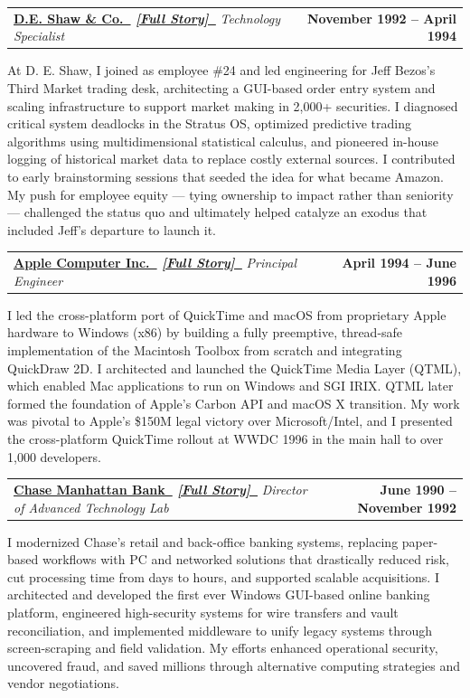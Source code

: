 \documentclass[letterpaper,11pt]{article}
\makeatletter
\newcommand{\faExternalLink}{\faIcon{external-link-alt}}
\renewcommand{\faExternalLink}{\faIcon{external-link-alt}}
\newcommand{\resumeItem}[1]{
    \item\small{
            {#1 \vspace{-2pt}}
    }
}
\newcommand{\resumeSubheading}[4]{
    \vspace{-2pt}\item
    \begin{tabular*}{1.0\textwidth}[t]{l@{\extracolsep{\fill}}r}
    \textbf{#1}  \textit{\small#3} & \textbf{\small #2} \\
    \end{tabular*}\vspace{-7pt}
}
\newcommand{\linkglyph}{{\LinkFont\symbol{"1F517}}}
\makeatother
\begin{document}
\resumeSubheading
{\href{https://www.deshaw.com}{D.E. Shaw \& Co.~\faExternalLink}
\quad\small
\textit
{\href {https://paul-charlton.vercel.app/story/25}{[Full Story]~{\linkglyph}}}
}
{November 1992 -- April 1994}
{Technology Specialist}
{New York, NY}
\resumeItem{
At D. E. Shaw, I joined as employee \#24 and led engineering for Jeff Bezos’s Third Market trading desk, architecting a GUI-based order entry system and scaling infrastructure to support market making in 2,000+ securities. I diagnosed critical system deadlocks in the Stratus OS, optimized predictive trading algorithms using multidimensional statistical calculus, and pioneered in-house logging of historical market data to replace costly external sources. I contributed to early brainstorming sessions that seeded the idea for what became Amazon. My push for employee equity — tying ownership to impact rather than seniority — challenged the status quo and ultimately helped catalyze an exodus that included Jeff’s departure to launch it.
}

\resumeSubheading
{\href{https://www.apple.com}{Apple Computer Inc.~\faExternalLink}
\quad\small
\textit
{\href{https://paul-charlton.vercel.app/story/11}{[Full Story]~{\linkglyph}}}
}
{April 1994 -- June 1996}
{Principal Engineer}
{Cupertino, CA}
\resumeItem{
I led the cross-platform port of QuickTime and macOS from proprietary Apple hardware to Windows (x86) by building a fully preemptive, thread-safe implementation of the Macintosh Toolbox from scratch and integrating QuickDraw 2D. I architected and launched the QuickTime Media Layer (QTML), which enabled Mac applications to run on Windows and SGI IRIX. QTML later formed the foundation of Apple’s Carbon API and macOS X transition. My work was pivotal to Apple’s \$150M legal victory over Microsoft/Intel, and I presented the cross-platform QuickTime rollout at WWDC 1996 in the main hall to over 1,000 developers.
}

\resumeSubheading
{\href{https://www.chase.com}{Chase Manhattan Bank~\faExternalLink}
\quad\small
\textit{
\href{https://paul-charlton.vercel.app/story/17}{[Full Story]~{\linkglyph}}}
}
{June 1990 -- November 1992}
{Director of Advanced Technology Lab}
{New York, NY}
\resumeItem{
I modernized Chase’s retail and back-office banking systems, replacing paper-based workflows with PC and networked solutions that drastically reduced risk, cut processing time from days to hours, and supported scalable acquisitions. I architected and developed the first ever Windows GUI-based online banking platform, engineered high-security systems for wire transfers and vault reconciliation, and implemented middleware to unify legacy systems through screen-scraping and field validation. My efforts enhanced operational security, uncovered fraud, and saved millions through alternative computing strategies and vendor negotiations.
}
\end{document}
